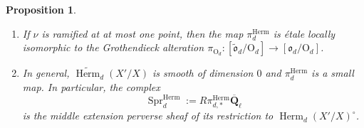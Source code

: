 \documentclass[reqno]{amsart}
\numberwithin{equation}{section}
\newcommand{\wt}[1]{\widetilde{#1}}
\newcommand{\Q}{\mathbf{Q}}
\DeclareMathOperator{\Sp}{Sp}
\DeclareMathOperator{\Herm}{Herm}
\DeclareMathOperator{\Spr}{Spr}
\newcommand{\SH}{\textup{SkHm}}
\newcommand{\Qlbar}{\overline{\Q}_\ell}
\renewcommand\c{\circ}
\renewcommand\sp{\mathfrak{sp}}
\newcommand\Og{\mathrm{O}}
\newcommand\fro{\mathfrak{o}}
\newtheorem{prop}[thm]{Proposition}
\theoremstyle{remark}
\numberwithin{equation}{section}
\begin{document}
\begin{prop}\label{p:SH Spr}
\begin{enumerate}
\item If $\nu$ is ramified at at most one point, then the map $\pi^{\Herm}_{d}$ is \'etale locally isomorphic to the Grothendieck alteration $\pi_{\Og_{d}}:[\wt\fro_{d}/\Og_{d}]\to [\fro_{d}/\Og_{d}]$. 
\item In general, $\wt\Herm_{d}(X'/X)$ is smooth of dimension $0$ and $\pi^{\Herm}_{d}$ is a small map. In particular, the complex
\begin{equation*}
\Spr^{\Herm}_{d}:=R\pi^{\Herm}_{d,*}\Qlbar
\end{equation*}
is the middle extension perverse sheaf of its restriction to $\Herm_{d}(X'/X)^{\c}$.
\end{enumerate}
\end{prop}
\end{document}
